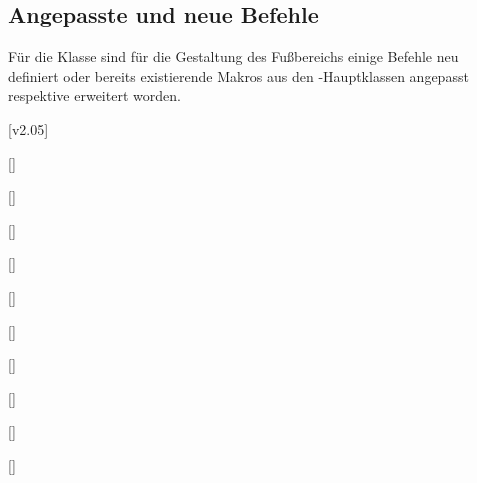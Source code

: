 \begin{Bundle*}[v2.05]{}
\section{Angepasste und neue Befehle}
%
Für die Klasse  sind für die Gestaltung des Fußbereichs 
einige Befehle neu definiert oder bereits existierende Makros aus den 
\TUDScript-Hauptklassen angepasst respektive erweitert worden.


[v2.05]

\begin{Declaration}{%
  []%
}
\begin{Declaration}{%
  []%
}
\begin{Declaration}{%
  []%
}
\begin{Declaration}{%
  []%
}
\printdeclarationlist%
\end{Declaration}
\end{Declaration}
\end{Declaration}
\end{Declaration}


\begin{Declaration}{%
  []%
}
\printdeclarationlist%
\end{Declaration}

\begin{Declaration}{[]}
\printdeclarationlist%
\end{Declaration}

\begin{Declaration}{[]}
\begin{Declaration}{[]}
\begin{Declaration}{[]}
\begin{Declaration}{[]}
\printdeclarationlist%
\end{Declaration}
\end{Declaration}
\end{Declaration}
\end{Declaration}

\begin{Declaration}{}
\begin{Declaration}{}
\begin{Declaration}{}
\printdeclarationlist%
%
\end{Declaration}
\end{Declaration}
\end{Declaration}


\end{Bundle*}
